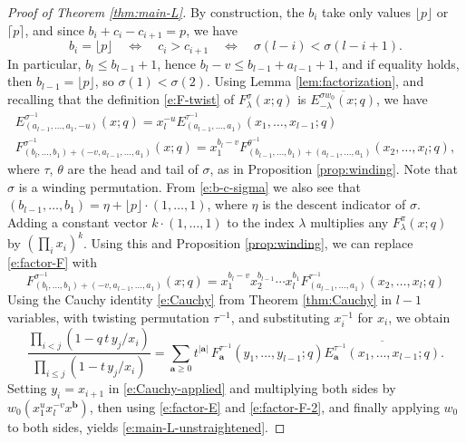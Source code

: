 \documentclass[12pt]{amsart}
\theoremstyle{definition}
\theoremstyle{remark}
\newcommand{\aA}{{\mathbf a}}
\newcommand{\bb}{{\mathbf b}}
\begin{document}
\begin{proof}[Proof of Theorem \ref{thm:main-L}]
By construction, the $b_{i}$ take only values $\lfloor p \rfloor$ or
$\lceil p \rceil$, and since $b_{i}+c_{i} - c_{i+1}= p$, we have
\begin{equation}\label{e:b-c-sigma}
b_{i} = \lfloor p \rfloor\quad \Leftrightarrow \quad c_{i}>c_{i+1}
\quad \Leftrightarrow \quad \sigma (l-i) < \sigma (l-i+1).
\end{equation}
In particular, $b_{l}\leq b_{l-1}+1$, hence $b_{l}-v\leq
b_{l-1}+a_{l-1}+1$, and if equality holds, then $b_{l-1} = \lfloor p
\rfloor$, so $\sigma (1)<\sigma (2)$.  Using Lemma
\ref{lem:factorization}, and recalling that the definition
\eqref{e:F-twist} of $F^{\sigma }_{\lambda }(x;q)$ is $
\overline{E^{\sigma w_{0}}_{-\lambda }(x;q)}$, we have
\begin{gather}\label{e:factor-E}
E^{\sigma ^{-1}}_{(a_{l-1},\ldots,a_{1},-u)}(x;q) = x_{l}^{-u} E^{\tau
^{-1}}_{(a_{l-1},
\ldots, a_{1})}(x_{1},\ldots,x_{l-1};q)\\
\label{e:factor-F}
F^{\sigma ^{-1}}_{(b_{l},\ldots,b_{1})+(-v,a_{l-1},\ldots,a_{1})}(x;q) =
x_{1}^{b_{l}-v} F^{\theta ^{-1}}_{(b_{l-1},\ldots,b_{1})+(a_{l-1},\ldots,a_{1})}(x_{2},\ldots,x_{l};q),
\end{gather}
where $\tau $, $\theta $ are the head and tail of $\sigma $, as in
Proposition \ref{prop:winding}.  Note that $\sigma $ is a winding
permutation.  From \eqref{e:b-c-sigma} we also see that
$(b_{l-1},\ldots,b_{1}) = \eta + \lfloor p \rfloor \cdot
(1,\ldots,1)$, where $\eta $ is the descent indicator of $\sigma $.
Adding a constant vector $k\cdot (1,\ldots,1)$ to the index $\lambda $
multiplies any $F^{\pi }_{\lambda }(x;q)$ by $(\prod _{i}x_{i})^{k}$.
Using this and Proposition \ref{prop:winding}, we can replace
\eqref{e:factor-F} with
\begin{equation}\label{e:factor-F-2}
F^{\sigma ^{-1}}_{(b_{l},\ldots,b_{1})+(-v,a_{l-1},\ldots,a_{1})}(x;q)
= x_{1}^{b_{l}-v}x_{2}^{b_{l-1}}\cdots x_{l}^{b_{1}} F^{\tau ^{-1}
}_{(a_{l-1},\ldots,a_{1})}(x_{2},\ldots,x_{l};q)
\end{equation}
Using the Cauchy identity \eqref{e:Cauchy} from Theorem
\ref{thm:Cauchy} in $l-1$ variables, with twisting permutation $\tau
^{-1}$, and substituting $x_{i}^{-1}$ for $x_{i}$, we obtain
\begin{equation}\label{e:Cauchy-applied}
\frac{\prod _{i<j} (1 - q\, t\, y_{j}/x_{i})}{\prod _{i\leq j} (1 -
t\, y_{j}/x_{i})} = \sum _{\aA \geq 0} t^{|\aA |}\, F^{\tau
^{-1}}_{\aA }(y_{1},\ldots,y_{l-1};q)\overline{E^{\tau ^{-1}}_{\aA
}(x_{1},\ldots,x_{l-1};q)}.
\end{equation}
Setting $y_{i} = x_{i+1}$ in \eqref{e:Cauchy-applied} and multiplying
both sides by $w_{0}(x_{1}^{u}x_{l}^{-v}x^{\bb })$, then using
\eqref{e:factor-E} and \eqref{e:factor-F-2}, and finally applying
$w_{0}$ to both sides, yields \eqref{e:main-L-unstraightened}.
\end{proof}
\end{document}
